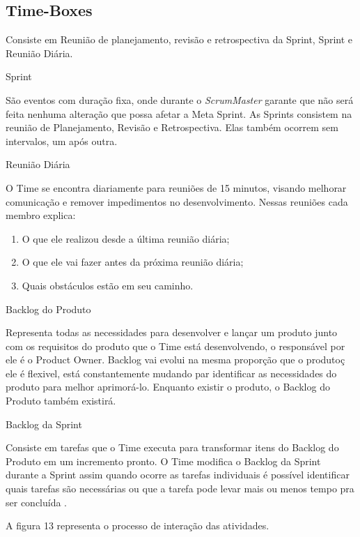\subsection{Time-Boxes}
Consiste em Reunião de planejamento, revisão e retrospectiva da Sprint, Sprint e Reunião Diária.

Sprint

São eventos com duração fixa, onde durante o \textit {ScrumMaster} garante que não será feita nenhuma alteração que possa afetar a Meta Sprint. As Sprints consistem na reunião de Planejamento, Revisão e Retrospectiva. Elas também ocorrem sem intervalos, um após outra.

Reunião Diária

O Time se encontra diariamente para reuniões de 15 minutos, visando melhorar comunicação e remover impedimentos no desenvolvimento. Nessas reuniões cada membro explica:

\begin{enumerate}
   \item O que ele realizou desde a última reunião diária;
   \item O que ele vai fazer antes da próxima reunião diária;
   \item  Quais obstáculos estão em seu caminho.
 \end{enumerate}

Backlog do Produto

Representa todas as necessidades para desenvolver e lançar um produto junto com os requisitos do produto que o Time está desenvolvendo, o responsável por ele é o Product Owner.  Backlog vai evolui na mesma proporção que o produtoç ele é flexivel, está constantemente mudando par identificar as necessidades do produto para melhor aprimorá-lo. Enquanto existir o produto, o Backlog do Produto também existirá.

Backlog da Sprint

Consiste em tarefas que o Time executa para transformar itens do Backlog do Produto em um incremento pronto. O Time modifica o Backlog da Sprint durante a Sprint assim quando ocorre as tarefas individuais é possível identificar quais tarefas são necessárias ou que a tarefa pode levar mais ou menos tempo pra ser concluída
.

	
A figura 13 representa o processo de interação das atividades.

	\begin{figure}[h!]
		\centering
	\end{figure}
 

